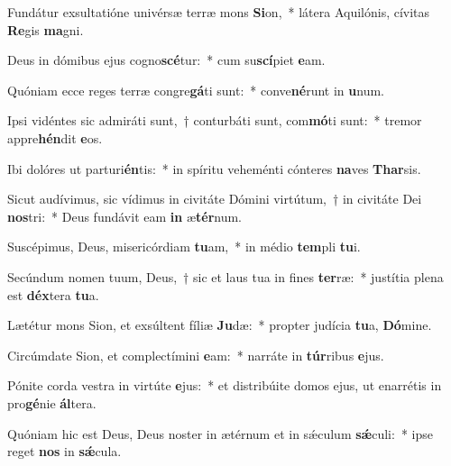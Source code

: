 \item Fundátur exsultatióne univérsæ terræ mons \textbf{Si}on,~* látera Aquilónis, cívitas \textbf{Re}gis \textbf{ma}gni.
\item Deus in dómibus ejus cogno\textbf{scé}tur:~* cum su\textbf{scí}piet \textbf{e}am.
\item Quóniam ecce reges terræ congre\textbf{gá}ti sunt:~* conve\textbf{né}runt in \textbf{u}num.
\item Ipsi vidéntes sic admiráti sunt,~† conturbáti sunt, com\textbf{mó}ti sunt:~* tremor appre\textbf{hén}dit \textbf{e}os.
\item Ibi dolóres ut parturi\textbf{én}tis:~* in spíritu veheménti cónteres \textbf{na}ves \textbf{Thar}sis.
\item Sicut audívimus, sic vídimus in civitáte Dómini virtútum,~† in civitáte Dei \textbf{nos}tri:~* Deus fundávit eam \textbf{in} æ\textbf{tér}num.
\item Suscépimus, Deus, misericórdiam \textbf{tu}am,~* in médio \textbf{tem}pli \textbf{tu}i.
\item Secúndum nomen tuum, Deus,~† sic et laus tua in fines \textbf{ter}ræ:~* justítia plena est \textbf{déx}tera \textbf{tu}a.
\item Lætétur mons Sion, et exsúltent fíliæ \textbf{Ju}dæ:~* propter judícia \textbf{tu}a, \textbf{Dó}mine.
\item Circúmdate Sion, et complectímini \textbf{e}am:~* narráte in \textbf{túr}ribus \textbf{e}jus.
\item Pónite corda vestra in virtúte \textbf{e}jus:~* et distribúite domos ejus, ut enarrétis in pro\textbf{gé}nie \textbf{ál}tera.
\item Quóniam hic est Deus, Deus noster in ætérnum et in sǽculum \textbf{sǽ}culi:~* ipse reget \textbf{nos} in \textbf{sǽ}cula.
